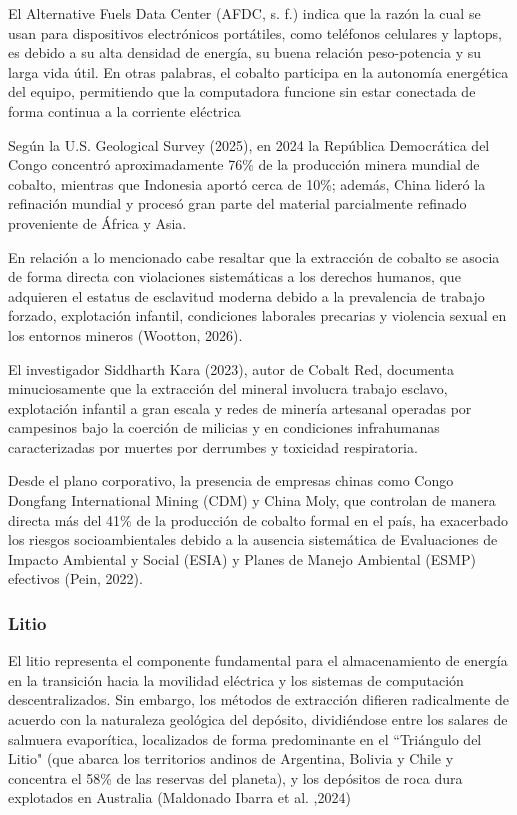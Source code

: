 \documentclass[stu,12pt,a4paper]{apa7}
\begin{document}
El Alternative Fuels Data Center (AFDC, s. f.) indica que la razón la cual se usan para  dispositivos electrónicos portátiles, como teléfonos celulares y laptops,  es debido a su alta densidad de energía, su buena relación peso-potencia y su larga vida útil. En otras palabras, el cobalto participa en la autonomía energética del equipo, permitiendo que la computadora funcione sin estar conectada de forma continua a la corriente eléctrica

Según la U.S. Geological Survey (2025), en 2024 la República Democrática del Congo concentró aproximadamente 76\% de la producción minera mundial de cobalto, mientras que Indonesia aportó cerca de 10\%; además, China lideró la refinación mundial y procesó gran parte del material parcialmente refinado proveniente de África y Asia.

En relación a lo mencionado cabe resaltar que la extracción de cobalto se asocia de forma directa con violaciones sistemáticas a los derechos humanos, que adquieren el estatus de esclavitud moderna debido a la prevalencia de trabajo forzado, explotación infantil, condiciones laborales precarias y violencia sexual en los entornos mineros (Wootton, 2026).

El investigador Siddharth Kara (2023), autor de Cobalt Red, documenta minuciosamente que la extracción del mineral involucra trabajo esclavo, explotación infantil a gran escala y redes de minería artesanal operadas por campesinos bajo la coerción de milicias y en condiciones infrahumanas caracterizadas por muertes por derrumbes y toxicidad respiratoria.

Desde el plano corporativo, la presencia de empresas chinas como Congo Dongfang International Mining (CDM) y China Moly, que controlan de manera directa más del 41\% de la producción de cobalto formal en el país, ha exacerbado los riesgos socioambientales debido a la ausencia sistemática de Evaluaciones de Impacto Ambiental y Social (ESIA) y Planes de Manejo Ambiental (ESMP) efectivos (Pein, 2022).

    
    \subsubsection{Litio}
El litio representa el componente fundamental para el almacenamiento de energía en la transición hacia la movilidad eléctrica y los sistemas de computación descentralizados. Sin embargo, los métodos de extracción difieren radicalmente de acuerdo con la naturaleza geológica del depósito, dividiéndose entre los salares de salmuera evaporítica, localizados de forma predominante en el ``Triángulo del Litio" (que abarca los territorios andinos de Argentina, Bolivia y Chile y concentra el 58\% de las reservas del planeta), y los depósitos de roca dura explotados en Australia (Maldonado Ibarra et al. ,2024)
\end{document}
